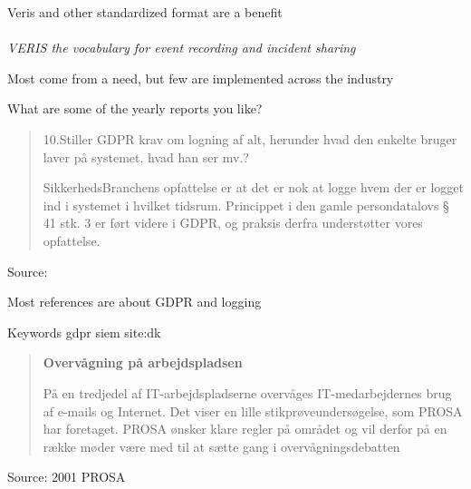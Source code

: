 \documentclass[Screen16to9,17pt]{foils}
\begin{document}
\begin{list2}
\item Veris and other standardized format are a benefit\\
\\
\emph{VERIS the vocabulary for event recording and incident sharing}
\item Most come from a need, but few are implemented across the industry
\end{list2}

\centerline{What are some of the yearly reports you like?}




\begin{quote}
  10.Stiller GDPR krav om logning af alt, herunder hvad den enkelte bruger laver på
  systemet, hvad han ser mv.?

  SikkerhedsBranchens opfattelse er at det er nok at logge hvem der er logget ind i
  systemet i hvilket tidsrum. Princippet i den gamle persondatalovs § 41 stk. 3 er
  ført videre i GDPR, og praksis derfra understøtter vores opfattelse.
\end{quote}
Source: 

\begin{list2}
\item Most references are about GDPR and logging
\item Keywords gdpr siem site:dk
  \item {}
\end{list2}




\begin{quote}{\bf
  Overvågning på arbejdspladsen}

  På en tredjedel af IT-arbejdspladserne overvåges IT-medarbejdernes brug af e-mails og Internet. Det viser en lille stikprøveundersøgelse, som PROSA har foretaget. PROSA ønsker klare regler på området og vil derfor på en række møder være med til at sætte gang i overvågningsdebatten
\end{quote}
Source: 2001 PROSA {\footnotesize{}}
\end{document}
